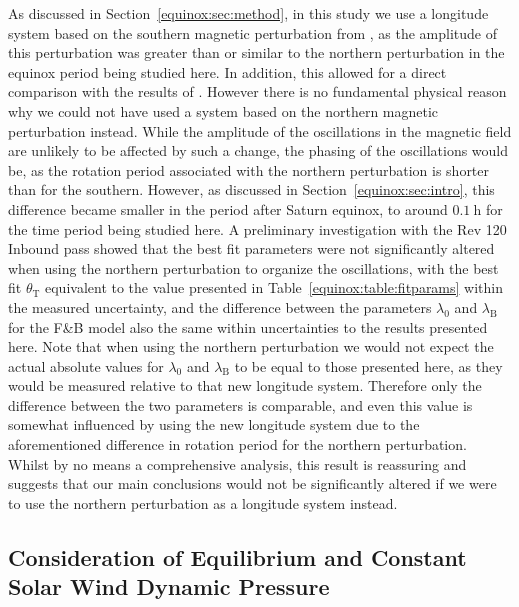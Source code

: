As discussed in Section~\ref{equinox:sec:method}, in this study we use a longitude system based on the southern magnetic perturbation from \citet{andrews2012}, as the amplitude of this perturbation was greater than or similar to the northern perturbation in the equinox period being studied here. In addition, this allowed for a direct comparison with the results of \citet{arridge2011}. However there is no fundamental physical reason why we could not have used a system based on the northern magnetic perturbation instead. While the amplitude of the oscillations in the magnetic field are unlikely to be affected by such a change, the phasing of the oscillations would be, as the rotation period associated with the northern perturbation is shorter than for the southern. However, as discussed in Section~\ref{equinox:sec:intro}, this difference became smaller in the period after Saturn equinox, to around $\SI{0.1}{\hour}$ for the time period being studied here. A preliminary investigation with the Rev 120 Inbound pass showed that the best fit parameters were not significantly altered when using the northern perturbation to organize the oscillations, with the best fit $\theta_\mathrm{T}$ equivalent to the value presented in Table~\ref{equinox:table:fitparams} within the measured uncertainty, and the difference between the parameters $\lambda_0$ and $\lambda_\mathrm{B}$ for the F{\&}B model also the same within uncertainties to the results presented here. Note that when using the northern perturbation we would not expect the actual absolute values for $\lambda_0$ and $\lambda_\mathrm{B}$ to be equal to those presented here, as they would be measured relative to that new longitude system. Therefore only the difference between the two parameters is comparable, and even this value is somewhat influenced by using the new longitude system due to the aforementioned difference in rotation period for the northern perturbation. Whilst by no means a comprehensive analysis, this result is reassuring and suggests that our main conclusions would not be significantly altered if we were to use the northern perturbation as a longitude system instead.


\subsection{Consideration of Equilibrium and Constant Solar Wind Dynamic Pressure}\label{equinox:sec:constDp}

